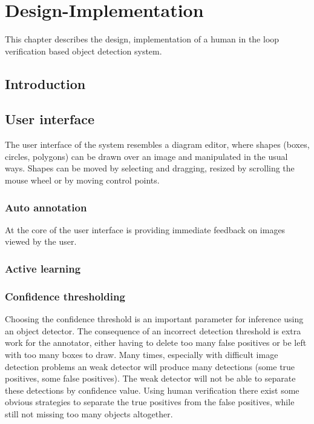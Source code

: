 \chapter{Design-Implementation}
\label{chap:design} 

This chapter describes the design, implementation of a human in the loop verification based object detection system.

\section{Introduction}

\section {User interface}

The user interface of the system resembles a diagram editor, where shapes (boxes, circles, polygons) can be drawn over an image and manipulated in the usual ways. Shapes can be moved by selecting and dragging, resized by scrolling the mouse wheel or by moving control points. 


\subsection {Auto annotation}

At the core of the user interface is providing immediate feedback on images viewed by the user.


\subsection{Active learning}


\subsection {Confidence thresholding}

Choosing the confidence threshold is an important parameter for inference using an object detector. The consequence of an incorrect detection threshold is extra work for the annotator, either having to delete too many false positives or be left with too many boxes to draw. Many times, especially with difficult image detection problems an weak detector will produce many detections (some true positives, some false positives). The weak detector will not be able to separate these detections by confidence value. Using human verification there exist some obvious strategies to separate the true positives from the false positives, while still not missing too many objects altogether. 


